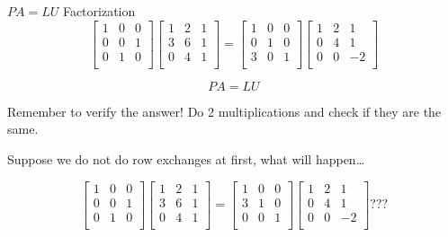 \documentclass{beamer}
\begin{document}
\begin{frame}{$PA=LU$ Factorization}
\begin{equation*}
    \left[ \begin{matrix}
        1&		0&		0\\
        0&		0&		1\\
        0&		1&		0\\
    \end{matrix} \right] \left[ \begin{matrix}
        1&		2&		1\\
        3&		6&		1\\
        0&		4&		1\\
    \end{matrix} \right] =\left[ \begin{matrix}
        1&		0&		0\\
        0&		1&		0\\
        3&		0&		1\\
    \end{matrix} \right] \left[ \begin{matrix}
        1&		2&		1\\
        0&		4&		1\\
        0&		0&		-2\\
    \end{matrix} \right]
\end{equation*}

\begin{equation*}
    PA=LU
\end{equation*}

Remember to verify the answer! Do 2 multiplications and check if they are the same.

Suppose we do not do row exchanges at first, what will happen\dots

\begin{equation*}
    \left[ \begin{matrix}
        1&		0&		0\\
        0&		0&		1\\
        0&		1&		0\\
    \end{matrix} \right] \left[ \begin{matrix}
        1&		2&		1\\
        3&		6&		1\\
        0&		4&		1\\
    \end{matrix} \right] =\left[ \begin{matrix}
        1&		0&		0\\
        3&		1&		0\\
        0&		0&		1\\
    \end{matrix} \right] \left[ \begin{matrix}
        1&		2&		1\\
        0&		4&		1\\
        0&		0&		-2\\
    \end{matrix} \right] ???
\end{equation*}


\end{frame}
\end{document}
